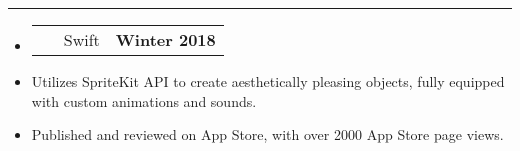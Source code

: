 \documentclass[10pt,letterpaper]{article}
\makeatletter
\newcommand{\items}[2]
{
	\begin{tabular*}{\linewidth}{l @{\extracolsep{\fill}} r}
		#1 & #2 \\
	\end{tabular*}
}
\makeatother
\begin{document}
\hrule

\begin{itemize}
	\item[]
		\items
			{
				\href{https://itunes.apple.com/us/app/tic-tac-emoji/id1346934986?mt=8}{\emph{\underline{\smash{\textbf{Tic-Tac Emoji}}}}} \ \ \ \footnotesize Swift
				}
				{\textbf{Winter 2018}}
		\item
			Utilizes SpriteKit API to create aesthetically pleasing objects, fully equipped with custom animations and sounds.	
		\item
			Published and reviewed on App Store, with over 2000 App Store page views. 
\end{itemize}
\end{document}
